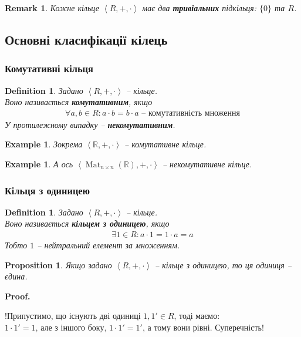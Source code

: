 \documentclass[a4paper, 10pt]{article}
\makeatletter
\theoremstyle{theoremdd}
\theoremstyle{theoremdd}
\newtheorem{definition}[theorem]{Definition}
\theoremstyle{theoremdd}
\theoremstyle{theoremdd}
\theoremstyle{theoremdd}
\newtheorem{example}[theorem]{Example}
\theoremstyle{theoremdd}
\theoremstyle{theoremdd}
\theoremstyle{theoremdd}
\theoremstyle{theoremdd}
\newtheorem{proposition}[theorem]{Proposition}
\theoremstyle{theoremdd}
\theoremstyle{theoremdd}
\newtheorem{remark}[theorem]{Remark}
\theoremstyle{theoremdd}
\theoremstyle{theoremdd}
\theoremstyle{theoremdd}
\theoremstyle{theoremdd}
\renewenvironment{proof}[1][Proof.\\]{\par
\pushQED{\hfill \qed}%
\normalfont \topsep6\p@\@plus6\p@\relax
\trivlist
\item\relax
{\bfseries
#1\@addpunct{.}}\hspace\labelsep\ignorespaces
}{%
\popQED\endtrivlist\@endpefalse
}
\DeclareMathOperator{\Mat}{Mat}
\makeatother
\begin{document}
\begin{remark}
Кожне кільце $\left<R,+,\cdot \right>$ має два \textbf{тривіальних} підкільця: $\{0\}$ та $R$.
\end{remark}

\subsection{Основні класифікації кілець}
\subsubsection{Комутативні кільця}
\begin{definition}
Задано $\left<R,+, \cdot \right>$ -- кільце.\\
Воно називається \textbf{комутативним}, якщо
\begin{align*}
\forall a,b \in R: a \cdot b = b \cdot a \text{ -- комутативність множення}
\end{align*}
У протилежному випадку -- \textbf{некомутативним}.
\end{definition}

\begin{example}
Зокрема $\left<\mathbb{R},+,\cdot \right>$ -- комутативне кільце.
\end{example}

\begin{example}
А ось $\left< \Mat_{n \times n}(\mathbb{R}), +, \cdot \right>$ -- некомутативне кільце.
\end{example}

\subsubsection{Кільця з одиницею}
\begin{definition}
Задано $\left<R,+, \cdot \right>$ -- кільце.\\
Воно називається \textbf{кільцем з одиницею}, якщо
\begin{align*}
\exists 1 \in R: a \cdot 1 = 1 \cdot a = a
\end{align*}
Тобто $1$ -- нейтральний елемент за множенням.
\end{definition}

\begin{proposition}
Якщо задано $\left<R,+, \cdot \right>$ -- кільце з одиницею, то ця одиниця -- єдина.
\end{proposition}

\begin{proof}
!Припустимо, що існують дві одиниці $1, 1' \in R$, тоді маємо:\\
$1 \cdot 1' = 1$, але з іншого боку, $1 \cdot 1' = 1'$, а тому вони рівні. Суперечність!
\end{proof}
\end{document}
